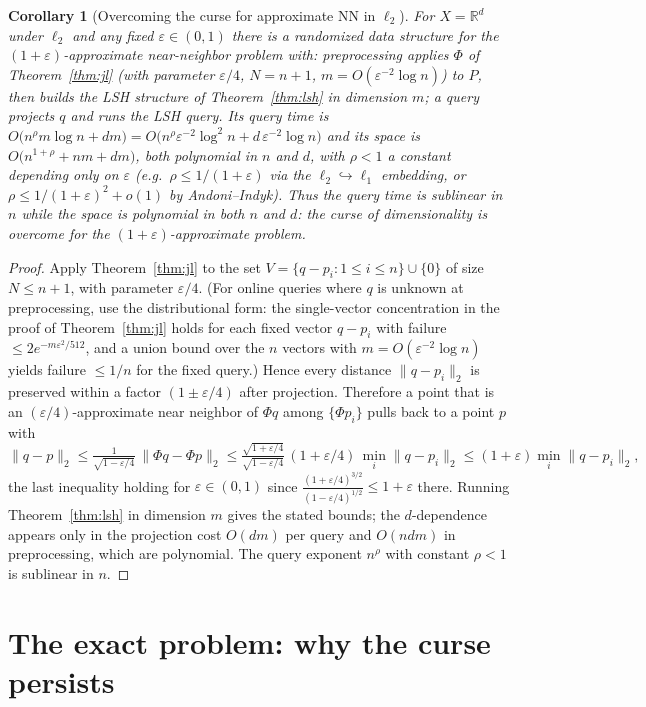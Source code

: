 \documentclass{amsart}
\newtheorem{corollary}{Corollary}
\newcommand{\R}{\mathbb{R}}
\newcommand{\eps}{\varepsilon}
\begin{document}
\begin{corollary}[Overcoming the curse for approximate NN in $\ell_2$]\label{cor:curse}
For $X=\R^d$ under $\ell_2$ and any fixed $\eps\in(0,1)$ there is a randomized data
structure for the $(1+\eps)$-approximate near-neighbor problem with:
preprocessing applies $\Phi$ of Theorem~\ref{thm:jl} (with parameter $\eps/4$,
$N=n+1$, $m=O(\eps^{-2}\log n)$) to $P$, then builds the LSH structure of
Theorem~\ref{thm:lsh} in dimension $m$; a query projects $q$ and runs the LSH query.
Its query time is
$O\big(n^{\rho}m\log n + dm\big)=O\big(n^{\rho}\eps^{-2}\log^2 n + d\,\eps^{-2}\log n\big)$
and its space is $O\big(n^{1+\rho}+nm+dm\big)$, both polynomial in $n$ and $d$, with
$\rho<1$ a constant depending only on $\eps$ (e.g.\ $\rho\le 1/(1+\eps)$ via the
$\ell_2\hookrightarrow\ell_1$ embedding, or $\rho\le 1/(1+\eps)^2+o(1)$ by
Andoni--Indyk).  Thus the query time is \emph{sublinear in $n$ while the space is
polynomial in both $n$ and $d$}: the curse of dimensionality is overcome for the
$(1+\eps)$-approximate problem.
\end{corollary}
\begin{proof}
Apply Theorem~\ref{thm:jl} to the set $V=\{q-p_i:1\le i\le n\}\cup\{0\}$ of size
$N\le n+1$, with parameter $\eps/4$.  (For online queries where $q$ is unknown at
preprocessing, use the distributional form: the single-vector concentration in the
proof of Theorem~\ref{thm:jl} holds for each fixed vector $q-p_i$ with failure
$\le 2e^{-m\eps^2/512}$, and a union bound over the $n$ vectors with
$m=O(\eps^{-2}\log n)$ yields failure $\le 1/n$ for the fixed query.)  Hence every
distance $\|q-p_i\|_2$ is preserved within a factor $(1\pm\eps/4)$ after projection.
Therefore a point that is an $(\eps/4)$-approximate near neighbor of $\Phi q$ among
$\{\Phi p_i\}$ pulls back to a point $p$ with
\[
\|q-p\|_2\le \tfrac{1}{\sqrt{1-\eps/4}}\,\|\Phi q-\Phi p\|_2
\le \tfrac{\sqrt{1+\eps/4}}{\sqrt{1-\eps/4}}\,(1+\eps/4)\,\min_i\|q-p_i\|_2
\le (1+\eps)\min_i\|q-p_i\|_2,
\]
the last inequality holding for $\eps\in(0,1)$ since
$\tfrac{(1+\eps/4)^{3/2}}{(1-\eps/4)^{1/2}}\le 1+\eps$ there.  Running
Theorem~\ref{thm:lsh} in dimension $m$ gives the stated bounds; the $d$-dependence
appears only in the projection cost $O(dm)$ per query and $O(ndm)$ in preprocessing,
which are polynomial.  The query exponent $n^{\rho}$ with constant $\rho<1$ is
sublinear in $n$.
\end{proof}

\section{The exact problem: why the curse persists}
\end{document}

